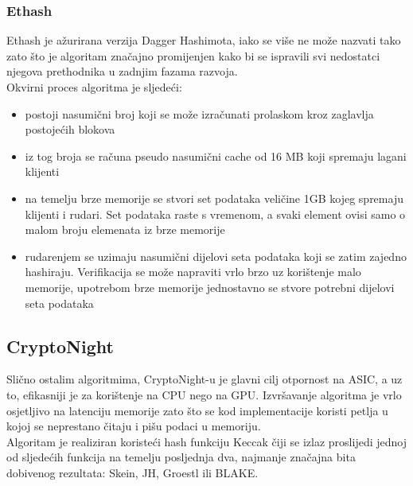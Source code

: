 \documentclass[12pt]{article}
\begin{document}
\subsubsection{Ethash}
Ethash je ažurirana verzija Dagger Hashimota, iako se više ne može nazvati tako zato što je algoritam značajno promijenjen kako bi se ispravili svi nedostatci njegova prethodnika u zadnjim fazama razvoja.\\
Okvirni proces algoritma je sljedeći:
\begin{itemize}
	\item postoji nasumični broj koji se može izračunati prolaskom kroz zaglavlja postojećih blokova 
	\item iz tog broja se računa pseudo nasumični cache od 16 MB koji spremaju lagani klijenti
	\item na temelju brze memorije se stvori set podataka veličine 1GB kojeg spremaju klijenti i rudari. Set podataka raste s vremenom, a svaki element ovisi samo o malom broju elemenata iz brze memorije
	\item rudarenjem se uzimaju nasumični dijelovi seta podataka koji se zatim zajedno hashiraju. Verifikacija se može napraviti vrlo brzo uz korištenje malo memorije, upotrebom brze memorije jednostavno se stvore potrebni dijelovi seta podataka\cite{ethash}
\end{itemize}
%

\subsection{CryptoNight}
Slično ostalim algoritmima, CryptoNight-u je glavni cilj otpornost na ASIC, a uz to, efikasniji je za korištenje na CPU nego na GPU. Izvršavanje algoritma je vrlo osjetljivo na latenciju memorije zato što se kod implementacije koristi petlja u kojoj se neprestano čitaju i pišu podaci u memoriju.\\
Algoritam je realiziran koristeći hash funkciju Keccak čiji se izlaz proslijedi jednoj od sljedećih funkcija na temelju posljednja dva, najmanje značajna bita dobivenog rezultata: Skein, JH, Groestl ili BLAKE.\cite{cryptonighgt}

\pagebreak
\end{document}
